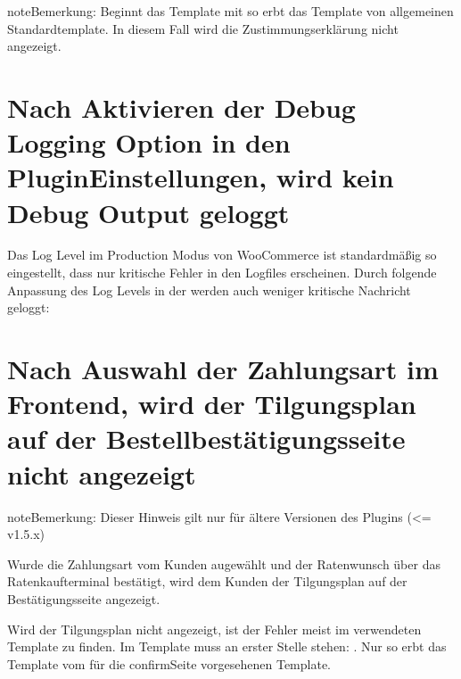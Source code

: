 \documentclass[a4paper,10pt,openany,oneside,ngerman]{sphinxmanual}
\begin{document}
\begin{sphinxadmonition}{note}{Bemerkung:}
Beginnt das Template mit  so erbt das Template von allgemeinen Standardtemplate. In diesem Fall wird die Zustimmungserklärung nicht angezeigt.
\end{sphinxadmonition}


\section{Nach Aktivieren der Debug Logging Option in den Plugin\sphinxhyphen{}Einstellungen, wird kein Debug Output geloggt}
\label{\detokenize{faq:nach-aktivieren-der-debug-logging-option-in-den-plugin-einstellungen-wird-kein-debug-output-geloggt}}
Das Log Level im Production Modus von WooCommerce ist standardmäßig so eingestellt, dass nur kritische Fehler in den Logfiles erscheinen.
Durch folgende Anpassung des Log Levels in der  werden auch weniger kritische Nachricht geloggt:

\begin{sphinxVerbatim}[commandchars=\\\{\}]
\PYG{x}{\PYGZsq{}logger\PYGZsq{} =\PYGZgt{} [}
\PYG{x}{]}
\end{sphinxVerbatim}


\section{Nach Auswahl der Zahlungsart im Frontend, wird der Tilgungsplan auf der Bestellbestätigungsseite nicht angezeigt}
\label{\detokenize{faq:nach-auswahl-der-zahlungsart-im-frontend-wird-der-tilgungsplan-auf-der-bestellbestatigungsseite-nicht-angezeigt}}
\begin{sphinxadmonition}{note}{Bemerkung:}
Dieser Hinweis gilt nur für ältere Versionen des Plugins (<= v1.5.x)
\end{sphinxadmonition}

Wurde die Zahlungsart vom Kunden augewählt und der Ratenwunsch über das Ratenkaufterminal bestätigt, wird dem Kunden der Tilgungsplan auf der Bestätigungsseite angezeigt.

Wird der Tilgungsplan nicht angezeigt, ist der Fehler meist im verwendeten Template zu finden. Im Template  muss an erster Stelle stehen: . Nur so erbt das Template vom für die confirm\sphinxhyphen{}Seite vorgesehenen Template.
\end{document}
